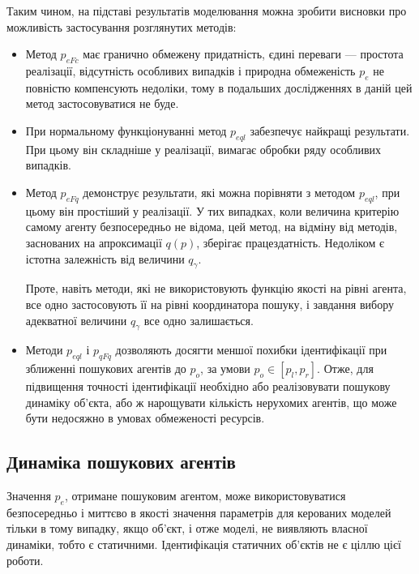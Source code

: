 Таким чином, на підставі результатів моделювання можна зробити висновки про
можливість застосування розглянутих методів:


\begin{itemize}

  \item
    Метод $p_{eFc}$ має гранично  обмежену придатність,
    єдині переваги --- простота реалізації,
    відсутність особливих випадків і природна обмеженість
    $p_e$ не повністю компенсують недоліки, тому в подальших
    дослідженнях в даній цей метод застосовуватися не буде.

  \item
    При нормальному функціонуванні метод $p_{eql}$ забезпечує найкращі
    результати. При цьому він складніше у реалізації, вимагає обробки ряду
    особливих випадків.

  \item
    Метод $p_{eFq}$ демонструє результати, які можна
    порівняти з методом $p_{eql}$, при цьому він простіший у реалізації. У тих
    випадках, коли величина критерію самому агенту безпосередньо не відома, цей
    метод, на відміну від методів, заснованих на апроксимації $q(p)$, зберігає
    працездатність. Недоліком є істотна залежність від величини $q_\gamma$.

    Проте, навіть методи, які не використовують функцію якості на
    рівні агента, все одно застосовують її на рівні координатора
    пошуку, і завдання вибору адекватної величини
    $q_\gamma$ все одно залишається.

  \item
    Методи $p_{eql}$ і $p_{qFq}$ дозволяють досягти меншої похибки
    ідентифікації при зближенні пошукових агентів до $p_o$, за умови $p_o \in [p_l, p_r]$.
    Отже, для підвищення точності ідентифікації необхідно або
    реалізовувати пошукову динаміку об'єкта, або ж нарощувати
    кількість нерухомих агентів, що може бути недосяжно в умовах
    обмеженості ресурсів.


\end{itemize}





\subsection{Динаміка пошукових агентів}%

Значення $p_e$, отримане пошуковим агентом, може використовуватися
безпосередньо і миттєво в якості значення параметрів для керованих моделей
тільки в тому випадку, якщо об'єкт, і отже моделі, не виявляють власної
динаміки, тобто є статичними. Ідентифікація статичних об'єктів не є ціллю
цієї роботи.

